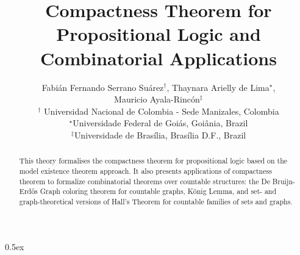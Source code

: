 \documentclass[11pt,a4paper]{article}
\begin{document}
\title{Compactness Theorem for Propositional Logic and Combinatorial Applications}
\author{Fabián Fernando Serrano Suárez$^\dag$,  Thaynara Arielly de Lima$^\star$, \\
Mauricio Ayala-Rincón$^\ddag$\\[2mm]
\mbox{}$^\dag$ Universidad Nacional de Colombia - 
Sede Manizales, Colombia \\[1mm]
\mbox{}$^\star$Universidade Federal de Goiás, Goiânia, Brazil\\[1mm] 
\mbox{}$^\ddag$Universidade de Brasília, Brasília D.F., Brazil\\
 }

\maketitle

\begin{abstract}
This theory formalises the compactness theorem for propositional 
logic based on the model existence theorem approach. 
It also presents applications of compactness theorem to formalize 
combinatorial theorems over countable structures:  
the De Bruijn-Erd\H{o}s Graph coloring theorem for countable graphs, 
König Lemma, and set- and graph-theoretical versions of Hall's Theorem for countable families of sets and graphs.
\end{abstract}




\tableofcontents

\parindent 0pt\parskip 0.5ex








%
\end{document}
